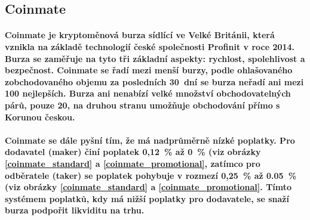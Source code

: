 \documentclass[thesis=B,czech]{FITthesis}[2019/03/21]
\begin{document}
\subsection{Coinmate}
\paragraph{
Coinmate je kryptoměnová burza sídlící ve Velké Británii, která vznikla na základě technologií české společnosti Profinit v roce 2014. Burza se zaměřuje na tyto tři základní aspekty: rychlost, spolehlivost a bezpečnost. Coinmate se řadí mezi menší burzy, podle ohlašovaného zobchodovaného objemu za posledních 30~dní se burza neřadí ani mezi 100 nejlepších. \cite{coinmarketcap} Burza ani nenabízí velké množství obchodovatelných párů, pouze 20, na druhou stranu umožňuje obchodování přímo s Korunou českou. 
}
\paragraph{
Coinmate se dále pyšní tím, že má nadprůměrně nízké poplatky. Pro dodavatel (maker) činí poplatek 0,12~\% až 0~\% (viz obrázky \ref{coinmate_standard} a \ref{coinmate_promotional}, zatímco pro odběratele (taker) se poplatek pohybuje v rozmezí 0,25~\% až 0.05~\% (viz obrázky \ref{coinmate_standard} a \ref{coinmate_promotional}. Tímto systémem poplatků, kdy má nižší poplatky pro dodavatele, se snaží burza podpořit likviditu na trhu. \cite{cryptowisser_coinmate} \cite{coinmate_fees}
}
\end{document}
